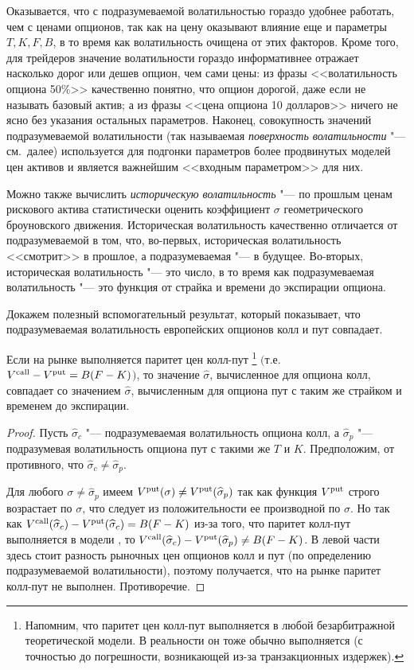 Оказывается, что с подразумеваемой волатильностью гораздо удобнее работать, чем с ценами опционов, так как на цену оказывают влияние еще и параметры $T,K,F,B$, в то время как волатильность очищена от этих факторов. 
Кроме того, для трейдеров значение волатильности гораздо информативнее отражает насколько дорог или дешев опцион, чем сами цены: из фразы <<волатильность опциона 50\%>> качественно понятно, что опцион дорогой, даже если не называть базовый актив; а из фразы <<цена опциона 10 долларов>> ничего не ясно без указания остальных параметров.
Наконец, совокупность значений подразумеваемой волатильности (так называемая \emph{поверхность волатильности} "--- см.~далее) используется для подгонки параметров более продвинутых моделей цен активов и является важнейшим <<входным параметром>> для них. 

\begin{remark}
Можно также вычислить \emph{историческую волатильность} "--- по прошлым ценам рискового актива статистически оценить коэффициент $\sigma$ геометрического броуновского движения.
Историческая волатильность качественно отличается от подразумеваемой в том, что, во-первых, историческая волатильность <<смотрит>> в прошлое, а подразумеваемая "--- в будущее. Во-вторых, историческая волатильность "--- это число, в то время как подразумеваемая волатильность "--- это функция от страйка и времени до экспирации опциона.
\end{remark}

Докажем полезный вспомогательный результат, который показывает, что подразумеваемая волатильность европейских опционов колл и пут совпадает.

\begin{proposition}
Если на рынке выполняется паритет цен колл-пут%
\footnote{Напомним, что паритет цен колл-пут выполняется в любой безарбитражной теоретической модели.
В реальности он тоже обычно выполняется (с точностью до погрешности, возникающей из-за транзакционных издержек).}
$($т.е.\ $V^{\text{\normalfont call}} - V^{\text{\normalfont put}} = B(F-K)$$)$, то значение $\hat\sigma$, вычисленное для опциона колл, совпадает со значением $\hat\sigma$, вычисленным для опциона пут с таким же страйком и временем до экспирации.
\end{proposition}

\begin{proof}
Пусть $\hat\sigma_c$ "--- подразумеваемая волатильность опциона колл, а $\hat\sigma_p$ "--- подразумевая волатильность опциона пут с такими же $T$ и $K$.
Предположим, от противного, что $\hat\sigma_c\neq \hat\sigma_p$. 

Для любого $\sigma \neq \hat\sigma_p$ имеем $V^{\text{\normalfont put}}(\sigma) \neq V^{\text{\normalfont put}}(\widehat\sigma_p)$ так как функция $V^{\text{\normalfont put}}$ строго возрастает по $\sigma$, что следует из положительности ее производной по $\sigma$. 
Но так как $V^{\text{\normalfont call}}(\widehat\sigma_c) - V^{\text{\normalfont put}}(\widehat\sigma_c) = B(F-K)$ из-за того, что паритет колл-пут выполняется в модели \bs, то $V^{\text{\normalfont call}}(\widehat\sigma_c) - V^{\text{\normalfont put}}(\widehat\sigma_p) \neq B(F-K)$.
В левой части здесь стоит разность рыночных цен опционов колл и пут (по определению подразумеваемой волатильности), поэтому получается, что на рынке паритет колл-пут не выполнен. 
Противоречие.
\end{proof}

